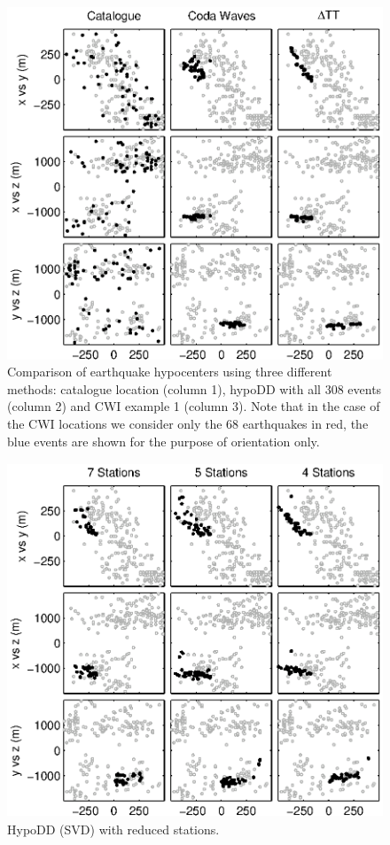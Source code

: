 \documentclass[extra]{gji}
\begin{document}
\begin{figure}
\includegraphics{diags/CalaverasLoc1.eps}
\caption{Comparison of earthquake hypocenters using three different methods: catalogue location (column 1), hypoDD with all
308 events (column 2) and CWI example 1 (column 3).
Note that in the case of the CWI locations we consider only the 68 earthquakes in red, the
blue events are shown for the purpose of orientation only.}
\label{fig-69Calaverasevents_eg1}
\end{figure}

\begin{figure}
\includegraphics[height = 25pc]{diags/CalaverasLoc3_hypoDD_SVD.eps}
\caption{HypoDD (SVD) with reduced stations.}
\label{fig-HYPODDreducesstats}
\end{figure}
\end{document}
